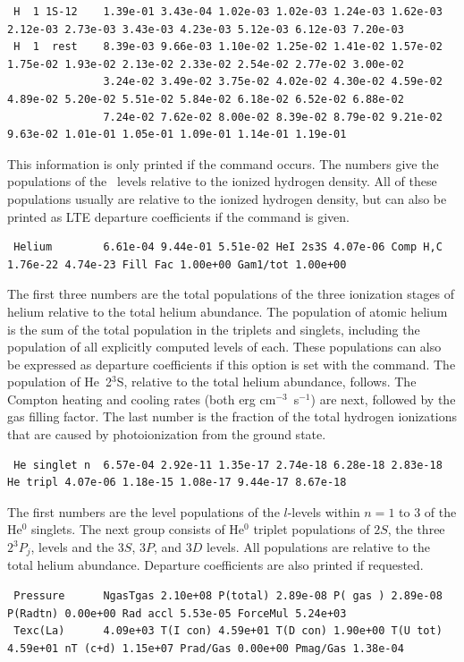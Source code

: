 {\setverbatimfontsize{\tiny}
\begin{verbatim}
 H  1 1S-12    1.39e-01 3.43e-04 1.02e-03 1.02e-03 1.24e-03 1.62e-03 2.12e-03 2.73e-03 3.43e-03 4.23e-03 5.12e-03 6.12e-03 7.20e-03
 H  1  rest    8.39e-03 9.66e-03 1.10e-02 1.25e-02 1.41e-02 1.57e-02 1.75e-02 1.93e-02 2.13e-02 2.33e-02 2.54e-02 2.77e-02 3.00e-02
               3.24e-02 3.49e-02 3.75e-02 4.02e-02 4.30e-02 4.59e-02 4.89e-02 5.20e-02 5.51e-02 5.84e-02 6.18e-02 6.52e-02 6.88e-02
               7.24e-02 7.62e-02 8.00e-02 8.39e-02 8.79e-02 9.21e-02 9.63e-02 1.01e-01 1.05e-01 1.09e-01 1.14e-01 1.19e-01
\end{verbatim}
}
This information is only printed if the
 command occurs.
The numbers give the populations of the \hO\ levels relative to the
ionized hydrogen density.
All of these populations usually are relative
to the ionized hydrogen density, but can also be printed as LTE departure
coefficients if the  command
is given.
{\setverbatimfontsize{\tiny}
\begin{verbatim}
 Helium        6.61e-04 9.44e-01 5.51e-02 HeI 2s3S 4.07e-06 Comp H,C 1.76e-22 4.74e-23 Fill Fac 1.00e+00 Gam1/tot 1.00e+00
\end{verbatim}
}

The first three numbers are the total populations of the three ionization
stages of helium relative to the total helium abundance.
The population
of atomic helium is the sum of the total population in the triplets and
singlets, including the population of all explicitly computed levels of
each.
These populations can also be expressed as departure coefficients
if this option is set with the  command.
The
population of He~2$^3$S, relative to the total helium abundance, follows.
The Compton heating and cooling rates (both erg cm$^{-3}$~s$^{-1}$) are next, followed
by the gas filling factor.
The last number is the fraction of the total
hydrogen ionizations that are caused by photoionization from the ground
state.
{\setverbatimfontsize{\tiny}
\begin{verbatim}
 He singlet n  6.57e-04 2.92e-11 1.35e-17 2.74e-18 6.28e-18 2.83e-18 He tripl 4.07e-06 1.18e-15 1.08e-17 9.44e-17 8.67e-18
\end{verbatim}
}

The first numbers are the level populations of the $l$-levels within
$n=1$ to 3 of the He$^0$ singlets.
The next group consists of He$^0$ triplet populations
of $2S$, the three $2^3P_j$, levels and the $3S$, $3P$, and $3D$ levels.  All populations
are relative to the total helium abundance.
Departure coefficients are
also printed if requested.
{\setverbatimfontsize{\tiny}
\begin{verbatim}
 Pressure      NgasTgas 2.10e+08 P(total) 2.89e-08 P( gas ) 2.89e-08 P(Radtn) 0.00e+00 Rad accl 5.53e-05 ForceMul 5.24e+03
 Texc(La)      4.09e+03 T(I con) 4.59e+01 T(D con) 1.90e+00 T(U tot) 4.59e+01 nT (c+d) 1.15e+07 Prad/Gas 0.00e+00 Pmag/Gas 1.38e-04
\end{verbatim}
}

